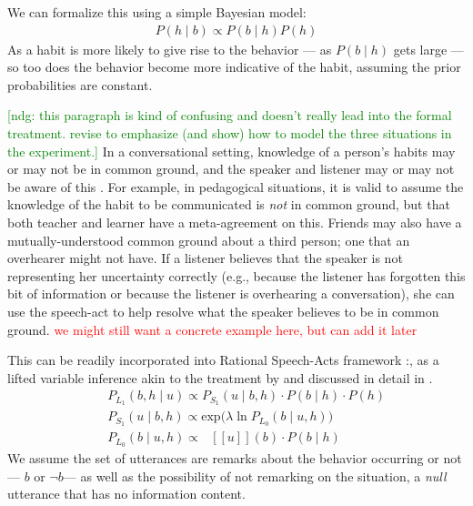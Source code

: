 \documentclass[10pt,letterpaper]{article}
\newcommand{\denote}[1]{\mbox{ $[\![ #1 ]\!]$}}
\newcommand{\red}[1]{\textcolor{Red}{#1}}
\newcommand{\ndg}[1]{\textcolor{Green}{[ndg: #1]}}
\begin{document}
We can formalize this using a simple Bayesian model:
\begin{eqnarray}
P(h \mid b) \propto P(b \mid h) P(h) \label{eq:bayes}
\end{eqnarray}
As a habit is more likely to give rise to the behavior --- as $P(b \mid h)$ gets large --- so too does the behavior become more indicative of the habit, assuming the prior probabilities are constant. 

\ndg{this paragraph is kind of confusing and doesn't really lead into the formal treatment. revise to emphasize (and show) how to model the three situations in the experiment.}
In a conversational setting, knowledge of a person's habits may or may not be in common ground, and the speaker and listener may or may not be aware of this \cite{Clark1977, Clark1996}. 
For example, in pedagogical situations, it is valid to assume the knowledge of the habit to be communicated is \emph{not} in common ground, but that both teacher and learner have a meta-agreement on this.
Friends may also have a mutually-understood common ground about a third person; one that an overhearer might not have. 
If a listener believes that the speaker is not representing her uncertainty correctly (e.g., because the listener has forgotten this bit of information or because the listener is overhearing a conversation), she can use the speech-act to help resolve what the speaker believes to be in common ground. 
\red{we might still want a concrete example here, but can add it later}

This can be readily incorporated into Rational Speech-Acts framework \cite{Frank2012, Goodman2013}:, as a lifted variable inference akin to the treatment by  and discussed in detail in .
%
\begin{eqnarray}
&&P_{L_1}(b, h \mid u)\propto P_{S_1}(u \mid b, h)\cdot P(b \mid h) \cdot P(h) \label{eq:L1}\\
&&P_{S_1}(u \mid b, h) \propto \mathrm{exp}({\lambda \ln P_{L_0}(b \mid u, h))} \label{eq:S1}\\
&&P_{L_0}(b \mid u, h)\propto \denote{u}(b) \cdot P(b \mid h) \label{eq:L0}
\end{eqnarray}
%
We assume the set of utterances are remarks about the behavior occurring or not --- $b$ or $\neg b$--- as well as the possibility of not remarking on the situation, a \emph{null} utterance that has no information content.  
\end{document}
